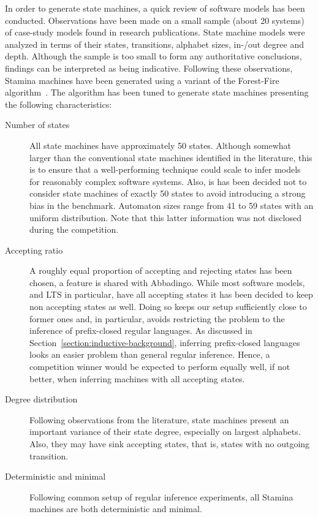 In order to generate state machines, a quick review of software models has been conducted. Observations have been made on a small sample (about 20 systems) of case-study models found in research publications. State machine models were analyzed in terms of their states, transitions, alphabet sizes, in-/out degree and depth. Although the sample is too small to form any authoritative conclusions, findings can be interpreted as being indicative. Following these observations, Stamina machines have been generated using a variant of the Forest-Fire algorithm~\cite{Leskovec2007}. The algorithm has been tuned to generate state machines presenting the following characteristics:

\begin{description}

\item[Number of states] All state machines have approximately 50 states. Although somewhat larger than the conventional state machines identified in the literature, this is to ensure that a well-performing technique could scale to infer models for reasonably complex software systems. Also, is has been decided not to consider state machines of exactly 50 states to avoid introducing a strong bias in the benchmark. Automaton sizes range from 41 to 59 states with an uniform distribution. Note that this latter information was not disclosed during the competition.

\item[Accepting ratio] A roughly equal proportion of accepting and rejecting states has been chosen, a feature is shared with Abbadingo. While most software models, and LTS in particular, have all accepting states it has been decided to keep non accepting states as well. Doing so keeps our setup sufficiently close to former ones and, in particular, avoids restricting the problem to the inference of prefix-closed regular languages. As discussed in Section~\ref{section:inductive-background}, inferring prefix-closed languages looks an easier problem than general regular inference. Hence, a competition winner would be expected to perform equally well, if not better, when inferring machines with all accepting states.

\item[Degree distribution] Following observations from the literature, state machines present an important variance of their state degree, especially on largest alphabets. Also, they may have sink accepting states, that is, states with no outgoing transition.

\item[Deterministic and minimal] Following common setup of regular inference experiments, all Stamina machines are both deterministic and minimal.

\end{description}

